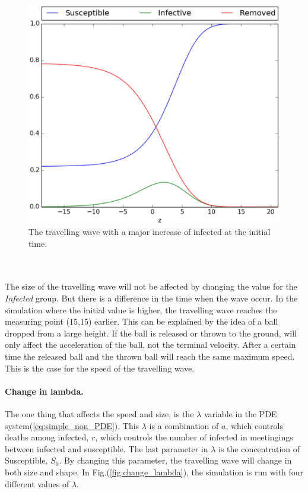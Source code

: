 \documentclass[%
twoside,                 %
final,                   %
10pt]{article}
\begin{document}
\begin{figure}[ht]
  \centerline{\includegraphics[width=0.8\linewidth]{plots/TW_2D_initial_z_lambda_0_5.eps}}
  \caption{
  \label{fig:initial_trav_wave} The travelling wave with a major increase of infected at the initial time.
  }
\end{figure}


\\
\\
The size of the travelling  wave will not be affected by changing the value for the \emph{Infected} group. But there is a difference in the time when the wave occur. In the simulation where the initial value is higher, the travelling wave reaches the measuring point (15,15) earlier. This can be explained by the idea of a ball dropped from a large height. If the ball is released or thrown to the ground, will only affect the acceleration of the ball, not the terminal velocity. After a certain time the released ball and the thrown ball will reach the same maximum speed. This is the case for the speed of the travelling wave. 
\paragraph{Change in lambda.}
The one thing that affects the speed and size, is the $\lambda$ variable in the PDE system(\ref{eq:simple_non_PDE}). This $\lambda$ is a combination of $a$, which controls deaths among infected, $r$, which controls the number of infected in meetingings between infected and susceptible. The last parameter in $\lambda$ is the concentration of Susceptible, $S_0$. By changing this parameter, the travelling wave will change in both size and shape. In Fig.(\ref{fig:change_lambda}), the simulation is run with four different values of $\lambda$.
\end{document}
